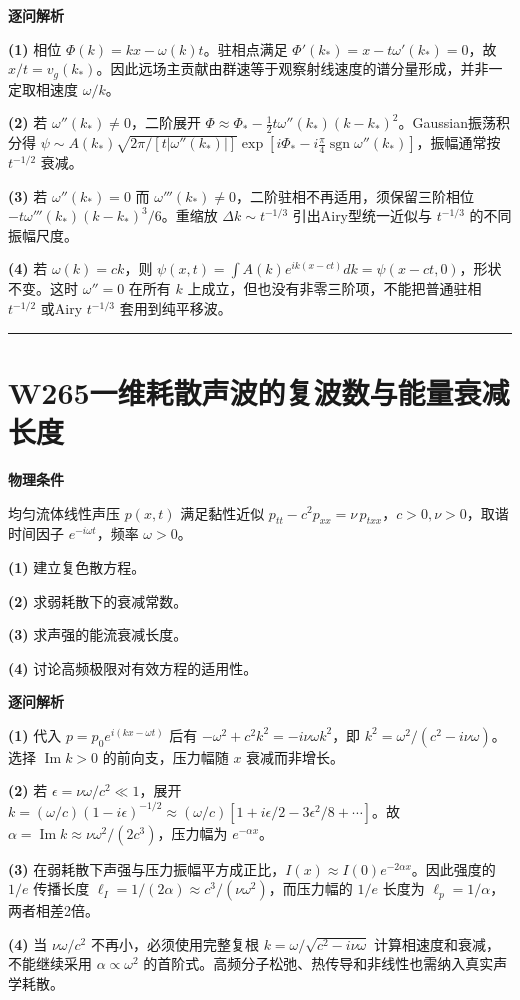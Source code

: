 \documentclass[UTF8,a4paper,11pt,oneside,openany]{ctexbook}
\begin{document}
\par\medskip\noindent\textbf{逐问解析}
\par\noindent\textbf{(1)} 相位 \(\Phi(k)=kx-\omega(k)t\)。驻相点满足 \(\Phi'(k_*)=x-t\omega'(k_*)=0\)，故 \(x/t=v_g(k_*)\)。因此远场主贡献由群速等于观察射线速度的谱分量形成，并非一定取相速度 \(\omega/k\)。
\par\noindent\textbf{(2)} 若 \(\omega''(k_*)\ne0\)，二阶展开 \(\Phi\approx\Phi_*-\frac12t\omega''(k_*)(k-k_*)^2\)。Gaussian振荡积分得 \(\psi\sim A(k_*)\sqrt{2\pi/[t|\omega''(k_*)|]}\exp[i\Phi_*-i\frac\pi4\operatorname{sgn}\omega''(k_*)]\)，振幅通常按 \(t^{-1/2}\) 衰减。
\par\noindent\textbf{(3)} 若 \(\omega''(k_*)=0\) 而 \(\omega'''(k_*)\ne0\)，二阶驻相不再适用，须保留三阶相位 \(-t\omega'''(k_*)(k-k_*)^3/6\)。重缩放 \(\Delta k\sim t^{-1/3}\) 引出Airy型统一近似与 \(t^{-1/3}\) 的不同振幅尺度。
\par\noindent\textbf{(4)} 若 \(\omega(k)=ck\)，则 \(\psi(x,t)=\int A(k)e^{ik(x-ct)}dk=\psi(x-ct,0)\)，形状不变。这时 \(\omega''=0\) 在所有 \(k\) 上成立，但也没有非零三阶项，不能把普通驻相 \(t^{-1/2}\) 或Airy \(t^{-1/3}\) 套用到纯平移波。

\par\bigskip\hrule\bigskip
\section*{W265\quad 一维耗散声波的复波数与能量衰减长度}
\textbf{物理条件}\par 均匀流体线性声压 \(p(x,t)\) 满足黏性近似 \(p_{tt}-c^2p_{xx}=\nu\,p_{txx}\)，\(c>0,\nu>0\)，取谐时间因子 \(e^{-i\omega t}\)，频率 \(\omega>0\)。
\par\noindent\textbf{(1)} 建立复色散方程。
\par\noindent\textbf{(2)} 求弱耗散下的衰减常数。
\par\noindent\textbf{(3)} 求声强的能流衰减长度。
\par\noindent\textbf{(4)} 讨论高频极限对有效方程的适用性。

\par\medskip\noindent\textbf{逐问解析}
\par\noindent\textbf{(1)} 代入 \(p=p_0e^{i(kx-\omega t)}\) 后有 \(-\omega^2+c^2k^2=-i\nu\omega k^2\)，即 \(k^2=\omega^2/(c^2-i\nu\omega)\)。选择 \(\operatorname{Im}k>0\) 的前向支，压力幅随 \(x\) 衰减而非增长。
\par\noindent\textbf{(2)} 若 \(\epsilon=\nu\omega/c^2\ll1\)，展开 \(k=(\omega/c)(1-i\epsilon)^{-1/2}\approx(\omega/c)[1+i\epsilon/2-3\epsilon^2/8+\cdots]\)。故 \(\alpha=\operatorname{Im}k\approx\nu\omega^2/(2c^3)\)，压力幅为 \(e^{-\alpha x}\)。
\par\noindent\textbf{(3)} 在弱耗散下声强与压力振幅平方成正比，\(I(x)\approx I(0)e^{-2\alpha x}\)。因此强度的 \(1/e\) 传播长度 \(\ell_I=1/(2\alpha)\approx c^3/(\nu\omega^2)\)，而压力幅的 \(1/e\) 长度为 \(\ell_p=1/\alpha\)，两者相差2倍。
\par\noindent\textbf{(4)} 当 \(\nu\omega/c^2\) 不再小，必须使用完整复根 \(k=\omega/\sqrt{c^2-i\nu\omega}\) 计算相速度和衰减，不能继续采用 \(\alpha\propto\omega^2\) 的首阶式。高频分子松弛、热传导和非线性也需纳入真实声学耗散。
\end{document}
